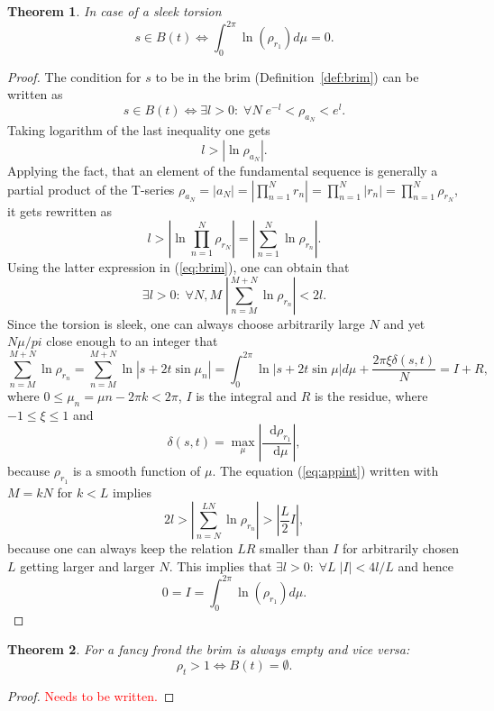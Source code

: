 \documentclass{article}
\newcommand{\be}{\begin{equation}}
\newcommand{\ee}{\end{equation}}
\newcommand*\df {\mathop{}\!\mathrm{d}}
\newcommand{\red}[1]{\textcolor{red}{#1}}
\theoremstyle{plain}
\newtheorem{theorem}{Theorem}[section]
\theoremstyle{definition}
\begin{document}
    \begin{theorem}\label{th:intbrim}
        In case of a sleek torsion $$
            s \in B(t) \Leftrightarrow 
            \int_0^{2\pi} \ln (\rho_{r_1}) d\mu = 0 
        .$$
    \end{theorem}
    \begin{proof}
        The condition for $s$ to be in the brim (Definition~\ref{def:brim}) can be written as 
        \be\label{eq:brim}
            s \in B(t) \Leftrightarrow \exists  l>0 
            :\; \forall N 
            \; e^{-l}<\rho_{ a_N}  < e^l
        .\ee 
        Taking logarithm of the last inequality one gets $$
            l>\left|\ln\rho_{ a_N}  \right|. 
        $$ Applying the fact, that an element of the fundamental sequence is generally a partial product of the T-series $\rho_{ a_N} =  \left|a_N \right|  = \left| \prod_{n=1}^{N} r_n \right| =\prod_{n=1}^{N}\left| r_n \right| =\prod_{n=1}^{N}\rho_{ r_N} $, it gets rewritten as $$
            l>\left|\ln\prod_{n=1}^{N} \rho_{ r_N} \right| =  \left|\sum_{n=1}^{N}\ln\rho_{ r_n} \right|
        .$$ Using the latter expression in (\ref{eq:brim}), one can obtain that 
        \be\label{eq:dis}
             \exists  l>0  %
             :\; \forall N,M %
             \; \left|\sum_{n=M}^{M+N}\ln\rho_{ r_n} \right| < 2l
        .\ee 
        Since the torsion is sleek, one can always choose arbitrarily large $N$ and yet $N\mu/pi$ close enough to an integer that \be\label{eq:appint}
            \sum_{n=M}^{M+N}\ln\rho_{ r_n} = \sum_{n=M}^{M+N}\ln|s + 2t \sin\mu_n| = \int_0^{2\pi} \ln |s + 2t \sin\mu| d\mu + \frac{2\pi\xi\delta(s,t)}N  = I + R,
        \ee where $0 \le \mu_n = \mu n - 2\pi k < 2 \pi$, $I$ is the integral and $R$ is the residue, where  $-1\le\xi\le1 $ and  $$
            \delta(s,t)= \max_{\mu}\left| \frac{\df{\rho_{ r_1}}}{\df{\mu}} \right|,
        $$  because ${\rho_{ r_1}}$ is a smooth function of $\mu$.
        The equation (\ref{eq:appint}) written with $M=kN$ for $k<L$ implies $$
            2l>\left|\sum_{n=N}^{LN}\ln\rho_{ r_n}\right| >\left|\frac L 2 I \right|,
        $$
        because one can always keep the relation $LR$ smaller than $I$ for arbitrarily chosen $L$ getting larger and larger $N$.   
        This implies that $ \exists l>0:\; \forall L\; |I|<4l/L$ and hence $$
            0 = I = \int_0^{2\pi} \ln (\rho_{r_1}) d\mu 
        .$$
    \end{proof}

    \begin{theorem}
        For a fancy frond the brim is always empty and vice versa: $$
            \rho_t>1 \Leftrightarrow B(t) = \emptyset
        .$$
    \end{theorem}
    \begin{proof}
        \red{Needs to be written.}
    \end{proof}
\end{document}

